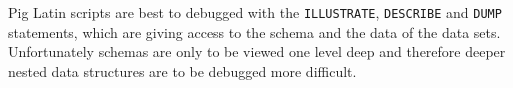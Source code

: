 Pig Latin scripts are best to debugged with the {\tt ILLUSTRATE}, {\tt DESCRIBE} and {\tt DUMP} statements, which are giving access to the schema and the data of the data sets. Unfortunately schemas are only to be viewed one level deep and therefore deeper nested data structures are to be debugged more difficult.
